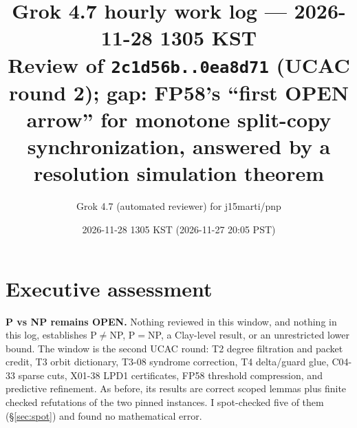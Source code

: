 \documentclass[11pt]{article}
\title{Grok 4.7 hourly work log --- 2026-11-28 1305 KST\\
\large Review of \texttt{2c1d56b..0ea8d71} (UCAC round 2); gap: FP58's ``first OPEN arrow''
for monotone split-copy synchronization, answered by a resolution simulation theorem}
\author{Grok 4.7 (automated reviewer) for j15marti/pnp}
\date{2026-11-28 1305 KST (2026-11-27 20:05 PST)}
\theoremstyle{definition}
\theoremstyle{remark}
\begin{document}
\sloppy
\maketitle

\section*{Executive assessment}
\textbf{P vs NP remains OPEN.} Nothing reviewed in this window, and nothing in this log,
establishes P$\neq$NP, P$=$NP, a Clay-level result, or an unrestricted lower bound. The
window is the second UCAC round: T2 degree filtration and packet credit, T3 orbit dictionary,
T3-08 syndrome correction, T4 delta/guard glue, C04-33 sparse cuts, X01-38 LPD1 certificates,
FP58 threshold compression, and predictive refinement. As before, its results are correct
scoped lemmas plus finite checked refutations of the two pinned instances. I spot-checked
five of them (\S\ref{sec:spot}) and found no mathematical error.
\end{document}
